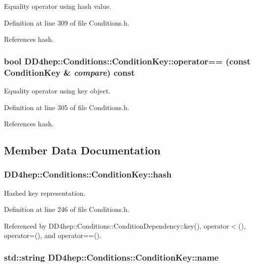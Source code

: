 Equality operator using hash value. 

Definition at line 309 of file Conditions.h.

References hash.\hypertarget{class_d_d4hep_1_1_conditions_1_1_condition_key_a4d70a04fb5de2bcbf7b3f4ef2366b6da}{
\subsubsection[{operator==}]{\setlength{\rightskip}{0pt plus 5cm}bool DD4hep::Conditions::ConditionKey::operator== (const {\bf ConditionKey} \& {\em compare}) const}}
\label{class_d_d4hep_1_1_conditions_1_1_condition_key_a4d70a04fb5de2bcbf7b3f4ef2366b6da}


Equality operator using key object. 

Definition at line 305 of file Conditions.h.

References hash.

\subsection{Member Data Documentation}
\hypertarget{class_d_d4hep_1_1_conditions_1_1_condition_key_a6eb2b4ac135f9ca4e35737a4d64c16b3}{
\subsubsection[{hash}]{ {\bf DD4hep::Conditions::ConditionKey::hash}}}
\label{class_d_d4hep_1_1_conditions_1_1_condition_key_a6eb2b4ac135f9ca4e35737a4d64c16b3}


Hashed key representation. 

Definition at line 246 of file Conditions.h.

Referenced by DD4hep::Conditions::ConditionDependency::key(), operator$<$(), operator=(), and operator==().\hypertarget{class_d_d4hep_1_1_conditions_1_1_condition_key_a37729a238b66d69101805d98199544c1}{
\subsubsection[{name}]{\setlength{\rightskip}{0pt plus 5cm}std::string {\bf DD4hep::Conditions::ConditionKey::name}}}
\label{class_d_d4hep_1_1_conditions_1_1_condition_key_a37729a238b66d69101805d98199544c1}


